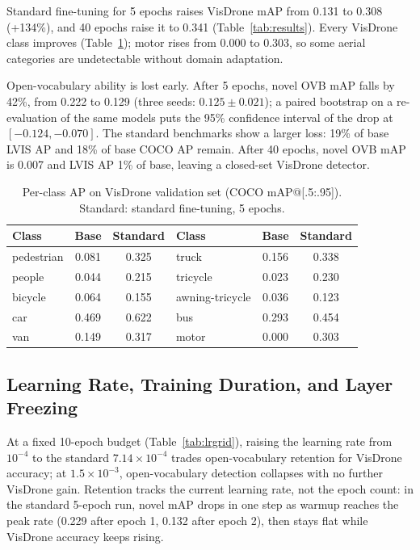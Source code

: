 \documentclass[conf]{new-aiaa}
\begin{document}
Standard fine-tuning for 5 epochs raises VisDrone mAP from 0.131 to 0.308 (+134\%), and 40
epochs raise it to 0.341 (Table~\ref{tab:results}). Every VisDrone class improves
(Table~\ref{tab:perclass}); motor rises from 0.000 to 0.303, so some aerial categories are
undetectable without domain adaptation.

Open-vocabulary ability is lost early. After 5 epochs, novel OVB mAP falls by 42\%, from 0.222
to 0.129 (three seeds: $0.125 \pm 0.021$); a paired bootstrap on a re-evaluation of the same
models puts the 95\% confidence interval of the drop at $[-0.124, -0.070]$. The standard
benchmarks show a larger loss: 19\% of base LVIS AP and 18\% of base COCO AP remain. After 40
epochs, novel OVB mAP is 0.007 and LVIS AP 1\% of base, leaving a closed-set VisDrone detector.


\begin{table}[hbt!]
\caption{Per-class AP on VisDrone validation set 
         (COCO mAP@[.5:.95]). Standard: standard fine-tuning, 5 epochs.}
\label{tab:perclass}
\centering
\begin{tabular}{lcc|lcc}
\hline
\textbf{Class} & \textbf{Base} & \textbf{Standard} & 
\textbf{Class} & \textbf{Base} & \textbf{Standard} \\
\hline
pedestrian      & 0.081 & 0.325 & truck           & 0.156 & 0.338 \\
people          & 0.044 & 0.215 & tricycle        & 0.023 & 0.230 \\
bicycle         & 0.064 & 0.155 & awning-tricycle & 0.036 & 0.123 \\
car             & 0.469 & 0.622 & bus             & 0.293 & 0.454 \\
van             & 0.149 & 0.317 & motor           & 0.000 & 0.303 \\
\hline
\end{tabular}
\end{table}

\subsection{Learning Rate, Training Duration, and Layer Freezing}

At a fixed 10-epoch budget (Table~\ref{tab:lrgrid}), raising the learning rate from $10^{-4}$
to the standard $7.14\times10^{-4}$ trades open-vocabulary retention for VisDrone accuracy; at
$1.5\times10^{-3}$, open-vocabulary detection collapses with no further VisDrone gain.
Retention tracks the current learning rate, not the epoch count: in the standard 5-epoch run,
novel mAP drops in one step as warmup reaches the peak rate (0.229 after epoch 1, 0.132 after
epoch 2), then stays flat while VisDrone accuracy keeps rising.
\end{document}
